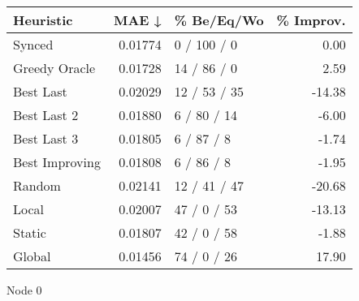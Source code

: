 \begin{tabular}{lrlr}
\toprule
\textbf{Heuristic} & \textbf{MAE ↓} & \textbf{\% Be/Eq/Wo} & \textbf{\% Improv.} \\
\midrule
            Synced &        0.01774 &          0 / 100 / 0 &                0.00 \\
     Greedy Oracle &        0.01728 &          14 / 86 / 0 &                2.59 \\
         Best Last &        0.02029 &         12 / 53 / 35 &              -14.38 \\
       Best Last 2 &        0.01880 &          6 / 80 / 14 &               -6.00 \\
       Best Last 3 &        0.01805 &           6 / 87 / 8 &               -1.74 \\
    Best Improving &        0.01808 &           6 / 86 / 8 &               -1.95 \\
            Random &        0.02141 &         12 / 41 / 47 &              -20.68 \\
             Local &        0.02007 &          47 / 0 / 53 &              -13.13 \\
            Static &        0.01807 &          42 / 0 / 58 &               -1.88 \\
            Global &        0.01456 &          74 / 0 / 26 &               17.90 \\
\bottomrule
\end{tabular}
\caption{Node 0}
\label{tab:non_lr05_le1_bs2_0}
